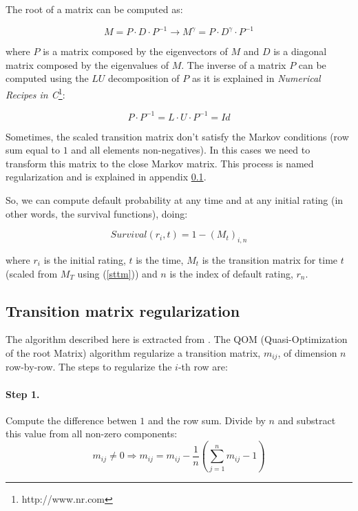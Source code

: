 \documentclass[a4paper,12pt,final]{article}
\begin{document}
The root of a matrix can be computed as:

\begin{displaymath}
M = P \cdot D \cdot P^{-1}
\longrightarrow
M^{\gamma} = P \cdot D^{\gamma} \cdot P^{-1}
\end{displaymath}

where $P$ is a matrix composed by the eigenvectors of $M$ and $D$ is a diagonal 
matrix composed by the eigenvalues of $M$. The inverse of a matrix $P$ can be 
computed using the $LU$ decomposition of $P$ as it is explained in \emph{Numerical 
Recipes in C}\footnote{http://www.nr.com}:

\begin{displaymath}
P \cdot P^{-1} = L \cdot U \cdot P^{-1} = Id
\end{displaymath}

Sometimes, the scaled transition matrix don't satisfy the Markov conditions
(row sum equal to $1$ and all elements non-negatives). In this cases we need
to transform this matrix to the close Markov matrix. This process is named 
regularization and is explained in appendix \ref{ap:regularization}.
\newline

So, we can compute default probability at any time and at any initial 
rating (in other words, the survival functions), doing:

\begin{displaymath}
Survival(r_i, t) = 1 - \left( M_t \right)_{i, n}
\end{displaymath}

where $r_i$ is the initial rating, $t$ is the time, $M_t$ is the transition 
matrix for time $t$ (scaled from $M_T$ using (\ref{sttm})) and $n$ is the 
index of default rating, $r_n$.

\subsection{Transition matrix regularization}
\label{ap:regularization}
The algorithm described here is extracted from \cite{trans:regularization}.
The QOM (Quasi-Optimization of the root Matrix) algorithm regularize a 
transition matrix, $m_{ij}$, of dimension $n$ row-by-row. The steps to 
regularize the $i$-th row are:

\paragraph{Step 1.} Compute the difference betwen $1$ and the row sum. 
Divide by $n$ and substract this value from all non-zero components:
\begin{displaymath}
m_{ij} \ne 0 
\Longrightarrow 
m_{ij} = m_{ij} - \frac{1}{n} \left( \sum_{j=1}^{n} m_{ij} - 1\right)
\end{displaymath}
\end{document}
